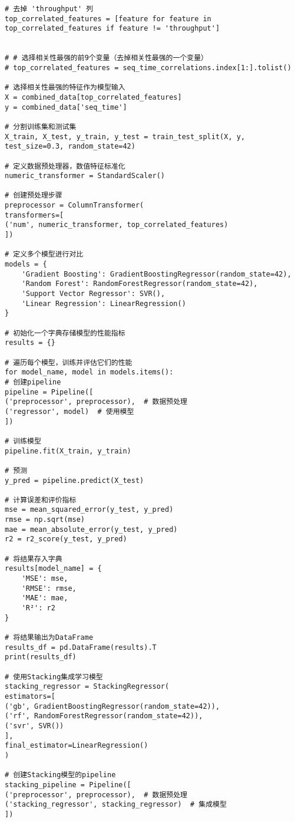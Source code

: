 \documentclass[bwprint]{gmcmthesis}
\begin{document}
\begin{lstlisting}
# 去掉 'throughput' 列
top_correlated_features = [feature for feature in top_correlated_features if feature != 'throughput']


# # 选择相关性最强的前9个变量（去掉相关性最强的一个变量）
# top_correlated_features = seq_time_correlations.index[1:].tolist()

# 选择相关性最强的特征作为模型输入
X = combined_data[top_correlated_features]
y = combined_data['seq_time']

# 分割训练集和测试集
X_train, X_test, y_train, y_test = train_test_split(X, y, test_size=0.3, random_state=42)

# 定义数据预处理器，数值特征标准化
numeric_transformer = StandardScaler()

# 创建预处理步骤
preprocessor = ColumnTransformer(
transformers=[
('num', numeric_transformer, top_correlated_features)
])

# 定义多个模型进行对比
models = {
	'Gradient Boosting': GradientBoostingRegressor(random_state=42),
	'Random Forest': RandomForestRegressor(random_state=42),
	'Support Vector Regressor': SVR(),
	'Linear Regression': LinearRegression()
}

# 初始化一个字典存储模型的性能指标
results = {}

# 遍历每个模型，训练并评估它们的性能
for model_name, model in models.items():
# 创建pipeline
pipeline = Pipeline([
('preprocessor', preprocessor),  # 数据预处理
('regressor', model)  # 使用模型
])

# 训练模型
pipeline.fit(X_train, y_train)

# 预测
y_pred = pipeline.predict(X_test)

# 计算误差和评价指标
mse = mean_squared_error(y_test, y_pred)
rmse = np.sqrt(mse)
mae = mean_absolute_error(y_test, y_pred)
r2 = r2_score(y_test, y_pred)

# 将结果存入字典
results[model_name] = {
	'MSE': mse,
	'RMSE': rmse,
	'MAE': mae,
	'R²': r2
}

# 将结果输出为DataFrame
results_df = pd.DataFrame(results).T
print(results_df)

# 使用Stacking集成学习模型
stacking_regressor = StackingRegressor(
estimators=[
('gb', GradientBoostingRegressor(random_state=42)),
('rf', RandomForestRegressor(random_state=42)),
('svr', SVR())
],
final_estimator=LinearRegression()
)

# 创建Stacking模型的pipeline
stacking_pipeline = Pipeline([
('preprocessor', preprocessor),  # 数据预处理
('stacking_regressor', stacking_regressor)  # 集成模型
])


\end{lstlisting}
\end{document}
